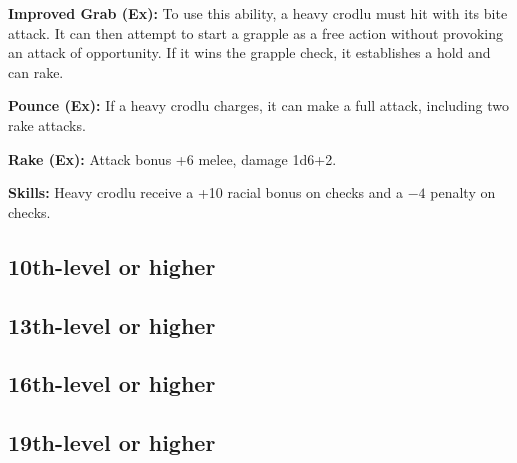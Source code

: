 \textbf{Improved Grab (Ex):} To use this ability, a heavy crodlu must hit with its bite attack. It can then attempt to start a grapple as a free action without provoking an attack of opportunity. If it wins the grapple check, it establishes a hold and can rake.

\textbf{Pounce (Ex):} If a heavy crodlu charges, it can make a full attack, including two rake attacks.

\textbf{Rake (Ex):} Attack bonus +6 melee, damage 1d6+2.

\textbf{Skills:} Heavy crodlu receive a +10 racial bonus on  checks and a $-4$ penalty on  checks.

\subsection{10th-level or higher}
\subsection{13th-level or higher}
\subsection{16th-level or higher}
\subsection{19th-level or higher}